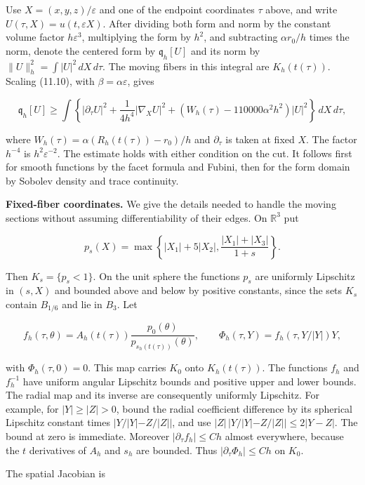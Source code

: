 \documentclass[11pt]{article}
\begin{document}
Use \(X=(x,y,z)/\varepsilon\) and one of the endpoint coordinates
\(\tau\) above, and write \(U(\tau,X)=u(t,\varepsilon X)\). After
dividing both form and norm by the constant volume factor
\(h\varepsilon^3\), multiplying the form by \(h^2\), and subtracting
\(\alpha r_0/h\) times the norm, denote the centered form by
\(\mathfrak q_h[U]\) and its norm by \(\|U\|_h^2=\int|U|^2\,dX\,d\tau\).
The moving fibers in this integral are \(K_h(t(\tau))\). Scaling
(11.10), with \(\beta=\alpha\varepsilon\), gives

\[
\mathfrak q_h[U]\ge
\int\left\{|\partial_\tau U|^2+
 \frac1{4h^4}|\nabla_XU|^2+
 (W_h(\tau)-110000\alpha^2h^2)|U|^2\right\}\,dX\,d\tau,
\tag{11.11}
\]

where \(W_h(\tau)=\alpha(R_h(t(\tau))-r_0)/h\) and \(\partial_\tau\) is
taken at fixed \(X\). The factor \(h^{-4}\) is \(h^2\varepsilon^{-2}\).
The estimate holds with either condition on the cut. It follows first
for smooth functions by the facet formula and Fubini, then for the form
domain by Sobolev density and trace continuity.

\textbf{Fixed-fiber coordinates.} We give the details needed to handle
the moving sections without assuming differentiability of their edges.
On \(\mathbb R^3\) put

\[
p_s(X)=\max\left\{|X_1|+5|X_2|,
 \frac{|X_1|+|X_3|}{1+s}\right\}.
\tag{11.12}
\]

Then \(K_s=\{p_s<1\}\). On the unit sphere the functions \(p_s\) are
uniformly Lipschitz in \((s,X)\) and bounded above and below by positive
constants, since the sets \(K_s\) contain \(B_{1/6}\) and lie in
\(B_3\). Let

\[
f_h(\tau,\theta)=
 A_h(t(\tau))\frac{p_0(\theta)}{p_{s_h(t(\tau))}(\theta)},
\qquad
\Phi_h(\tau,Y)=f_h(\tau,Y/|Y|)Y,
\tag{11.13}
\]

with \(\Phi_h(\tau,0)=0\). This map carries \(K_0\) onto
\(K_h(t(\tau))\). The functions \(f_h\) and \(f_h^{-1}\) have uniform
angular Lipschitz bounds and positive upper and lower bounds. The radial
map and its inverse are consequently uniformly Lipschitz. For example,
for \(|Y|\ge|Z|>0\), bound the radial coefficient difference by its
spherical Lipschitz constant times \(|Y/|Y|-Z/|Z||\), and use
\(|Z|\,|Y/|Y|-Z/|Z||\le2|Y-Z|\). The bound at zero is immediate.
Moreover \(|\partial_\tau f_h|\le Ch\) almost everywhere, because the
\(t\) derivatives of \(A_h\) and \(s_h\) are bounded. Thus
\(|\partial_\tau\Phi_h|\le Ch\) on \(K_0\).

The spatial Jacobian is
\end{document}
